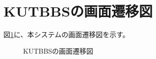\documentclass[a4j]{jarticle}
\begin{document}
\newpage
\section{KUTBBSの画面遷移図}
図\ref{fig:Screen_transition}に、本システムの画面遷移図を示す。
\begin{figure}[H]
\centering
{}
\caption{KUTBBSの画面遷移図}
\label{fig:Screen_transition}
\end{figure}
\end{document}
